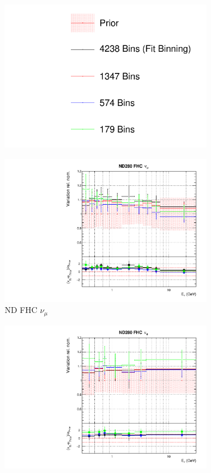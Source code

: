 \begin{figure}[t]
\centering
\begin{subfigure}{0.95\textwidth}
  \centering
  \includegraphics[width=0.24\linewidth]{figs/detcovbin_leg}
  \caption{}
  \label{fig:}
\end{subfigure}
\begin{subfigure}{0.24\textwidth}
  \centering
  \includegraphics[width=0.95\linewidth]{figs/detcovbinflux_0}
  \caption{ND FHC $\nu_{\mu}$}
  \label{fig:}
\end{subfigure}
\begin{subfigure}{0.24\textwidth}
  \centering
  \includegraphics[width=0.95\linewidth]{figs/detcovbinflux_1}

\end{subfigure}
\end{figure}
